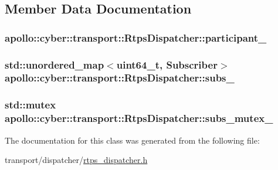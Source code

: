 \subsection{Member Data Documentation}
\hypertarget{classapollo_1_1cyber_1_1transport_1_1RtpsDispatcher_a8c472e08afebd0087e51fe5b9eeae6e4}{
\subsubsection[{participant\-\_\-}]{ apollo\-::cyber\-::transport\-::\-Rtps\-Dispatcher\-::participant\-\_\-\hspace{0.3cm}{\ttfamily [private]}}}\label{classapollo_1_1cyber_1_1transport_1_1RtpsDispatcher_a8c472e08afebd0087e51fe5b9eeae6e4}
\hypertarget{classapollo_1_1cyber_1_1transport_1_1RtpsDispatcher_a8ff80d52b17b3a5c07d960078ee14914}{
\subsubsection[{subs\-\_\-}]{\setlength{\rightskip}{0pt plus 5cm}std\-::unordered\-\_\-map$<$uint64\-\_\-t, {\bf Subscriber}$>$ apollo\-::cyber\-::transport\-::\-Rtps\-Dispatcher\-::subs\-\_\-\hspace{0.3cm}{\ttfamily [private]}}}\label{classapollo_1_1cyber_1_1transport_1_1RtpsDispatcher_a8ff80d52b17b3a5c07d960078ee14914}
\hypertarget{classapollo_1_1cyber_1_1transport_1_1RtpsDispatcher_a78bc088bc5b4c3d9fb0624e4d9a8b098}{
\subsubsection[{subs\-\_\-mutex\-\_\-}]{\setlength{\rightskip}{0pt plus 5cm}std\-::mutex apollo\-::cyber\-::transport\-::\-Rtps\-Dispatcher\-::subs\-\_\-mutex\-\_\-\hspace{0.3cm}{\ttfamily [private]}}}\label{classapollo_1_1cyber_1_1transport_1_1RtpsDispatcher_a78bc088bc5b4c3d9fb0624e4d9a8b098}


The documentation for this class was generated from the following file\-:\begin{DoxyCompactItemize}
\item 
transport/dispatcher/\hyperlink{rtps__dispatcher_8h}{rtps\-\_\-dispatcher.\-h}\end{DoxyCompactItemize}
